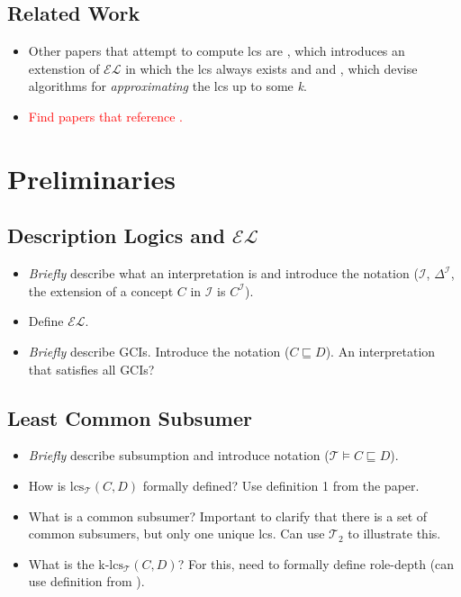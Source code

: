 \documentclass[a4paper,USenglish,cleveref,autoref,thm-restate]{lipics-v2021}
\newcommand{\EL}{{\(\mathcal{EL}\)}}
\newcommand{\interpretation}{\mathcal{I}}
\newcommand{\TBox}{\mathcal{T}}
\newcommand{\interdomain}{\Delta^{\interpretation{}}}
\newcommand{\interfunc}[1]{{#1}^{\interpretation{}}}
\newcommand{\lcs}[2]{\text{lcs}_{\TBox}(#1, #2)}
\begin{document}
\subsection{Related Work}
        \begin{itemize}
            \item Other papers that attempt to compute lcs are \cite{DBLP:conf/ecai/LutzPW10}, 
            which introduces an extenstion of \EL{} in which the lcs always exists and 
            \cite{DBLP:journals/japll/BaaderST07} and \cite{DBLP:conf/esws/PenalozaT11}, 
            which devise algorithms for \textit{approximating} the lcs up to some \textit{k}. 
            \item \textcolor{red}{Find papers that reference \cite{DBLP:conf/ijcai/ZarriessT13}.}
        \end{itemize}

    
\section{Preliminaries}
\label{sec:prelims}

\subsection{Description Logics and \EL{}}

    \begin{itemize}
        \item \textit{Briefly} describe what an interpretation is and introduce the notation ($\interpretation$, $\interdomain$, the extension of a concept $C$ in $\interpretation$ is $\interfunc{C}$).
        \item Define \EL{}.  
        \item \textit{Briefly} describe GCIs. Introduce the notation ($C \sqsubseteq D$). An interpretation that satisfies all GCIs?
    \end{itemize}

\subsection{Least Common Subsumer}
    
    \begin{itemize}
        \item \textit{Briefly} describe subsumption and introduce notation ($\TBox \models C \sqsubseteq D$). 
        \item How is $\lcs{C}{D}$ formally defined? Use definition 1 from the paper. 
        \item What is a common subsumer? Important to clarify that there is a set 
        of common subsumers, but only one unique lcs. Can use $\TBox_2$ to
        illustrate this.  
        \item What is the k-$\lcs{C}{D}$? For this, need to formally define role-depth (can use definition from \cite{Baader_Horrocks_Lutz_Sattler_2017}). 
    \end{itemize}
\end{document}
